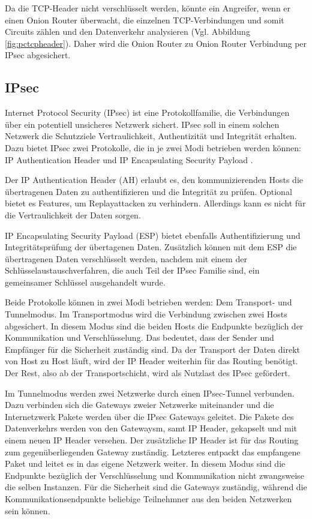 \documentclass[fleqn,envcountsame,runningheads,10pt,a4paper]{llncs}
\begin{document}
Da die TCP-Header nicht verschlüsselt werden, könnte ein Angreifer, wenn er einen Onion Router überwacht, die einzelnen TCP-Ver\-bin\-dung\-en und somit Circuits zählen und den Datenverkehr analysieren (Vgl. Abbildung \ref{fig:pctcpheader}). Daher wird die Onion Router zu Onion Router Verbindung per IPsec abgesichert.

\subsection{IPsec}

Internet Protocol Security (IPsec) ist eine Protokollfamilie, die Verbindungen über ein potentiell unsicheres Netzwerk sichert. IPsec soll in einem solchen Netzwerk die Schutzziele Vertraulichkeit, Authentizität und Integrität erhalten. Dazu bietet IPsec zwei Protokolle, die in je zwei Modi betrieben werden können: IP Authentication Header \cite{rfc:ah} und IP Encapsulating Security Payload \cite{rfc:esp}.

Der IP Authentication Header (AH) erlaubt es, den kommunizierenden Hosts die übertragenen Daten zu authentifizieren und die Integrität zu prüfen. Optional bietet es Features, um Replayattacken zu verhindern. Allerdings kann es nicht für die Vertraulichkeit der Daten sorgen.

IP Encapsulating Security Payload (ESP) bietet ebenfalls Authentifizierung und In\-te\-gri\-täts\-prü\-fung der übertagenen Daten. Zusätzlich können mit dem ESP die übertragenen Daten verschlüsselt werden, nachdem mit einem der Schlüsselaustauschverfahren, die auch Teil der IPsec Familie sind, ein gemeinsamer Schlüssel ausgehandelt wurde. 

Beide Protokolle können in zwei Modi betrieben werden: Dem Transport- und Tunnelmodus. Im Transportmodus wird die Verbindung zwischen zwei Hosts abgesichert. In diesem Modus sind die beiden Hosts die Endpunkte bezüglich der Kommunikation und Verschlüsselung. Das bedeutet, dass der Sender und Empfänger für die Sicherheit zuständig sind. Da der Transport der Daten direkt von Host zu Host läuft, wird der IP Header weiterhin für das Routing benötigt. Der Rest, also ab der Transportschicht, wird als Nutzlast des IPsec gefördert.

Im Tunnelmodus werden zwei Netzwerke durch einen IPsec-Tunnel verbunden. Dazu verbinden sich die Gateways zweier Netzwerke miteinander und die Internetzwerk Pakete werden über die IPsec Gateways geleitet. Die Pakete des Datenverkehrs werden von den Gatewaysm, samt IP Header, gekapselt und mit einem neuen IP Header versehen. Der zusätzliche IP Header ist für das Routing zum gegenüberliegenden Gateway zuständig. Letzteres entpackt das empfangene Paket und leitet es in das eigene Netzwerk weiter. In diesem Modus sind die Endpunkte bezüglich der Verschlüsselung und Kommunikation nicht zwangsweise die selben Instanzen. Für die Sicherheit sind die Gateways zuständig, während die Kommunikationsendpunkte beliebige Teilnehmner aus den beiden Netzwerken sein können.
\end{document}
